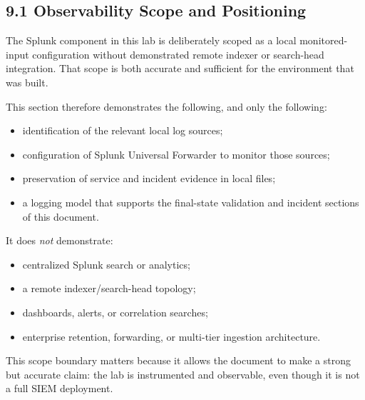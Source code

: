 \documentclass[11pt]{article}
\begin{document}
\subsection{9.1 Observability Scope and Positioning}
\label{sec:observability-scope-and-positioning}

The Splunk component in this lab is deliberately scoped as a local monitored-input configuration without demonstrated remote indexer or search-head integration. That scope is both accurate and sufficient for the environment that was built.

This section therefore demonstrates the following, and only the following:

\begin{itemize}
    \item identification of the relevant local log sources;
    \item configuration of Splunk Universal Forwarder to monitor those sources;
    \item preservation of service and incident evidence in local files;
    \item a logging model that supports the final-state validation and incident sections of this document.
\end{itemize}

It does \emph{not} demonstrate:

\begin{itemize}
    \item centralized Splunk search or analytics;
    \item a remote indexer/search-head topology;
    \item dashboards, alerts, or correlation searches;
    \item enterprise retention, forwarding, or multi-tier ingestion architecture.
\end{itemize}

This scope boundary matters because it allows the document to make a strong but accurate claim: the lab is instrumented and observable, even though it is not a full SIEM deployment.

\end{document}
